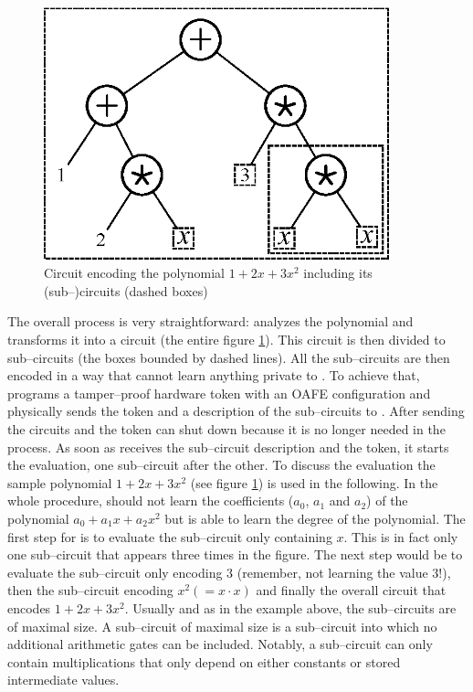 \begin{figure}[htb]
  \centering
  \includegraphics[width=10cm]{images/sample-polynomial.eps}
  \caption{Circuit encoding the polynomial $1 + 2x + 3x^2$ including its
    (sub--)circuits (dashed boxes)}
  \label{fig:sample-poly}
\end{figure}

The overall process is very straightforward: \JWpOne{} analyzes the polynomial
and transforms it into a circuit (the entire figure \ref{fig:sample-poly}). This
circuit is then divided to sub--circuits (the boxes bounded by dashed lines).
All the sub--circuits are then encoded in a way that \JWpTwo{} cannot learn
anything private to \JWpOne{}. To achieve that, \JWpOne{} programs a
tamper--proof hardware token with an OAFE configuration and physically sends the
token and a description of the sub--circuits to \JWpTwo{}.  After sending the
circuits and the token \JWpOne{} can shut down because it is no longer needed in
the process. As soon as \JWpTwo{} receives the sub--circuit description and the
token, it starts the evaluation, one sub--circuit after the other. To discuss
the evaluation the sample polynomial $1 + 2x + 3x^2$ (see figure
\ref{fig:sample-poly}) is used in the following. In the whole procedure,
\JWpTwo{} should not learn the coefficients ($a_0$, $a_1$ and $a_2$) of the
polynomial $a_0 + a_1x + a_2x^2$ but is able to learn the degree of the
polynomial. The first step for \JWpTwo{} is to evaluate the sub--circuit only
containing $x$.  This is in fact only one sub--circuit that appears three times
in the figure.  The next step would be to evaluate the sub--circuit only
encoding $3$ (remember, not learning the value $3$!), then the sub--circuit
encoding $x^2 (= x \cdot x)$ and finally the overall circuit that encodes $1 +
2x + 3x^2$.  Usually and as in the example above, the sub--circuits are of
maximal size. A sub--circuit of maximal size is a sub--circuit into which no
additional arithmetic gates can be included. Notably, a sub--circuit can only
contain multiplications that only depend on either constants or stored
intermediate values.

